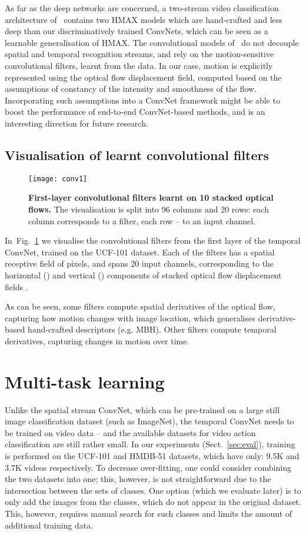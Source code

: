 \documentclass{article} \usepackage{nips14submit_e,times}
\makeatletter
\newcommand{\figref}[1]{Fig.~\ref{#1}}
\newcommand{\sref}[1]{Sect.~\ref{#1}}
\newcommand*{\eg}{e.g.\@\xspace}
\makeatother
\begin{document}
As far as the deep networks are concerned, a two-stream video classification architecture of~\cite{Kuehne11} contains two HMAX models which are hand-crafted and less deep than our
discriminatively trained ConvNets, which can be seen as a learnable generalisation of HMAX. The convolutional models of~\cite{Ji13,Karpathy14} do not decouple spatial and temporal
recognition streams, and rely on the motion-sensitive convolutional filters, learnt from the data. In our case, motion is explicitly represented using the optical flow displacement
field, computed based on the assumptions of constancy of the intensity and smoothness of the flow. Incorporating such assumptions into a ConvNet framework might be able to boost the 
performance of end-to-end ConvNet-based methods, and is an interesting direction for future research.

\subsection{Visualisation of learnt convolutional filters}
\label{sec:vis_conv}

\begin{figure}[ht]
\centering
\texttt{[image: conv1]}
\caption{\textbf{First-layer convolutional filters learnt on 10 stacked optical flows.}
The visualisation is split into 96 columns and 20 rows: each column corresponds to a filter, each row -- to an input channel.}
\label{fig:conv1}
\end{figure}
In~\figref{fig:conv1} we visualise the convolutional filters from the first layer of the temporal ConvNet, trained on the UCF-101 dataset.
Each of the  filters has a spatial receptive field of  pixels, and spans 20 input channels, corresponding to the horizontal ()
and vertical () components of  stacked optical flow displacement fields .

As can be seen, some filters compute spatial derivatives of the optical flow, capturing how motion changes with image location, which generalises
derivative-based hand-crafted descriptors (\eg MBH).
Other filters compute temporal derivatives, capturing changes in motion over time.

\section{Multi-task learning}
\label{sec:multi}

Unlike the spatial stream ConvNet, which can be pre-trained on a large
still image classification dataset (such as ImageNet), the temporal
ConvNet needs to be trained on video data -- and the available datasets
for video action classification are still rather small.  In our experiments
(\sref{sec:eval}), training is performed on the UCF-101 and HMDB-51
datasets, which have only: 9.5K and 3.7K videos
respectively.  To decrease over-fitting, one could consider combining
the two datasets into one; this, however, is not straightforward due
to the intersection between the sets of classes. 
One option (which we evaluate later) is to only add the images from the classes, which do not appear in the original dataset.
This, however, requires manual search for such classes and limits the amount of additional training data.
\end{document}
